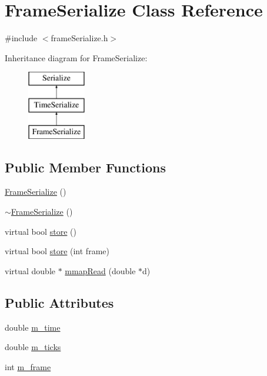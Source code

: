 \hypertarget{classFrameSerialize}{\section{Frame\-Serialize Class Reference}
\label{classFrameSerialize}
}


{\ttfamily \#include $<$frame\-Serialize.\-h$>$}

Inheritance diagram for Frame\-Serialize\-:\begin{figure}[H]
\begin{center}
\leavevmode
\includegraphics[height=3.000000cm]{classFrameSerialize}
\end{center}
\end{figure}
\subsection*{Public Member Functions}
\begin{DoxyCompactItemize}
\item 
\hyperlink{classFrameSerialize_a9f0dd912a61be08b54b1d8b5ba5c7f8b}{Frame\-Serialize} ()
\item 
\hyperlink{classFrameSerialize_af457bbe269ca51a7ee49514929b0e9e5}{$\sim$\-Frame\-Serialize} ()
\item 
virtual bool \hyperlink{classFrameSerialize_a5c2bbf78b071f73554611b82ad395573}{store} ()
\item 
virtual bool \hyperlink{classFrameSerialize_aa687bac3fbff650d93d45be0ad83de5f}{store} (int frame)
\item 
virtual double $\ast$ \hyperlink{classFrameSerialize_a9d775f9c379f0444a82cd309bba9e9b1}{mmap\-Read} (double $\ast$d)
\end{DoxyCompactItemize}
\subsection*{Public Attributes}
\begin{DoxyCompactItemize}
\item 
double \hyperlink{classFrameSerialize_a0be80383beb183887e34850ef542be32}{m\-\_\-time}
\item 
double \hyperlink{classFrameSerialize_a3299fc53239b5e9d4c1c6441be8c5a00}{m\-\_\-ticks}
\item 
int \hyperlink{classFrameSerialize_a6cf05a591ccdbea37fda4192e51b18cf}{m\-\_\-frame}
\end{DoxyCompactItemize}


